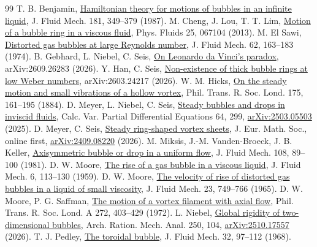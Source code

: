 \documentclass[11pt]{article}
\begin{document}
\begin{thebibliography}{99}
 T. B. Benjamin, \href{https://doi.org/10.1017/S002211208700212X}{Hamiltonian theory for motions of bubbles in an infinite liquid}, J. Fluid Mech. 181, 349--379 (1987).
 M. Cheng, J. Lou, T. T. Lim, \href{https://doi.org/10.1063/1.4811407}{Motion of a bubble ring in a viscous fluid}, Phys. Fluids 25, 067104 (2013).
 M. El Sawi, \href{https://doi.org/10.1017/S0022112074000620}{Distorted gas bubbles at large Reynolds number}, J. Fluid Mech. 62, 163--183 (1974).
 B. Gebhard, L. Niebel, C. Seis, \href{https://arxiv.org/abs/2609.26283}{On Leonardo da Vinci's paradox}, arXiv:2609.26283 (2026).
 Y. Han, C. Seis, \href{https://arxiv.org/abs/2603.24217}{Non-existence of thick bubble rings at low Weber numbers}, arXiv:2603.24217 (2026).
 W. M. Hicks, \href{https://doi.org/10.1098/rstl.1884.0008}{On the steady motion and small vibrations of a hollow vortex}, Phil. Trans. R. Soc. Lond. 175, 161--195 (1884).
 D. Meyer, L. Niebel, C. Seis, \href{https://doi.org/10.1007/s00526-025-03144-w}{Steady bubbles and drops in inviscid fluids}, Calc. Var. Partial Differential Equations 64, 299, \href{https://arxiv.org/abs/2503.05503}{arXiv:2503.05503} (2025).
 D. Meyer, C. Seis, \href{https://doi.org/10.4171/JEMS/1757}{Steady ring-shaped vortex sheets}, J. Eur. Math. Soc., online first, \href{https://arxiv.org/abs/2409.08220}{arXiv:2409.08220} (2026).
 M. Miksis, J.-M. Vanden-Broeck, J. B. Keller, \href{https://doi.org/10.1017/S0022112081002000}{Axisymmetric bubble or drop in a uniform flow}, J. Fluid Mech. 108, 89--100 (1981).
 D. W. Moore, \href{https://doi.org/10.1017/S0022112059000520}{The rise of a gas bubble in a viscous liquid}, J. Fluid Mech. 6, 113--130 (1959).
 D. W. Moore, \href{https://doi.org/10.1017/S0022112065001660}{The velocity of rise of distorted gas bubbles in a liquid of small viscosity}, J. Fluid Mech. 23, 749--766 (1965).
 D. W. Moore, P. G. Saffman, \href{https://doi.org/10.1098/rsta.1972.0055}{The motion of a vortex filament with axial flow}, Phil. Trans. R. Soc. Lond. A 272, 403--429 (1972).
 L. Niebel, \href{https://doi.org/10.1007/s00205-026-02262-9}{Global rigidity of two-dimensional bubbles}, Arch. Ration. Mech. Anal. 250, 104, \href{https://arxiv.org/abs/2510.17557}{arXiv:2510.17557} (2026).
 T. J. Pedley, \href{https://doi.org/10.1017/S0022112068000601}{The toroidal bubble}, J. Fluid Mech. 32, 97--112 (1968).

\end{thebibliography}
\end{document}
